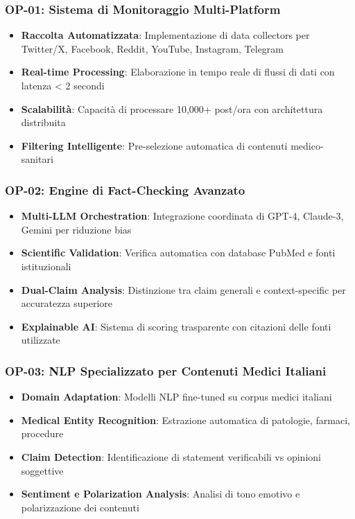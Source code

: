 \documentclass[12pt,a4paper]{report}
\begin{document}
\subsubsection{OP-01: Sistema di Monitoraggio Multi-Platform}

\begin{itemize}
    \item \textbf{Raccolta Automatizzata}: Implementazione di data collectors per Twitter/X, Facebook, Reddit, YouTube, Instagram, Telegram
    \item \textbf{Real-time Processing}: Elaborazione in tempo reale di flussi di dati con latenza < 2 secondi
    \item \textbf{Scalabilità}: Capacità di processare 10,000+ post/ora con architettura distribuita
    \item \textbf{Filtering Intelligente}: Pre-selezione automatica di contenuti medico-sanitari
\end{itemize}

\subsubsection{OP-02: Engine di Fact-Checking Avanzato}

\begin{itemize}
    \item \textbf{Multi-LLM Orchestration}: Integrazione coordinata di GPT-4, Claude-3, Gemini per riduzione bias
    \item \textbf{Scientific Validation}: Verifica automatica con database PubMed e fonti istituzionali
    \item \textbf{Dual-Claim Analysis}: Distinzione tra claim generali e context-specific per accuratezza superiore
    \item \textbf{Explainable AI}: Sistema di scoring trasparente con citazioni delle fonti utilizzate
\end{itemize}

\subsubsection{OP-03: NLP Specializzato per Contenuti Medici Italiani}

\begin{itemize}
    \item \textbf{Domain Adaptation}: Modelli NLP fine-tuned su corpus medici italiani
    \item \textbf{Medical Entity Recognition}: Estrazione automatica di patologie, farmaci, procedure
    \item \textbf{Claim Detection}: Identificazione di statement verificabili vs opinioni soggettive
    \item \textbf{Sentiment e Polarization Analysis}: Analisi di tono emotivo e polarizzazione dei contenuti
\end{itemize}
\end{document}
